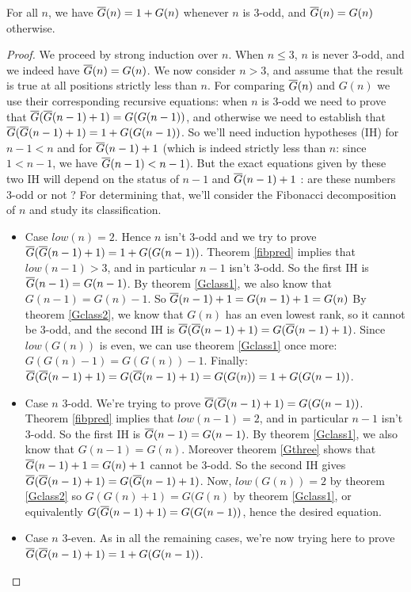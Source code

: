 \documentclass[a4paper,11pt]{article}
\begin{document}
\begin{theorem}\label{comp-fg-g}
For all $n$, we have $\overline{G}(n)=1+G(n)$ whenever $n$ is 3-odd,
and $\overline{G}(n)=G(n)$ otherwise.
\end{theorem}
\begin{proof}
We proceed by strong induction over $n$.
When $n\le 3$, $n$ is never \mbox{3-odd}, and we indeed have
$\overline{G}(n)=G(n)$. We now consider $n>3$, and assume that
the result is true at all positions strictly less than $n$.
For comparing $\overline{G}(n)$ and $G(n)$ we use their corresponding
recursive equations: when $n$ is 3-odd we need to prove that
$\overline{G}(\overline{G}(n-1)+1)=G(G(n-1))$, and otherwise we need to establish
that $\overline{G}(\overline{G}(n-1)+1)=1+G(G(n-1))$. So we'll need
induction hypotheses (IH) for $n-1<n$ and for $\overline{G}(n-1)+1$
(which is indeed strictly less than $n$:
since $1<n-1$, we have $\overline{G}(n-1)<n-1$). But the exact equations
given by these two IH will depend on the
status of $n-1$ and $\overline{G}(n-1)+1$ : are these numbers 3-odd or not ?
For determining that, we'll consider the Fibonacci decomposition
of $n$ and study its classification.
\begin{itemize}
\item Case $low(n)=2$. Hence $n$ isn't 3-odd and we try to prove
  $\overline{G}(\overline{G}(n-1)+1)=1+G(G(n-1))$. Theorem \ref{fibpred} implies that
  $low(n-1)>3$, and in particular $n-1$ isn't 3-odd.
  So the first IH is $\overline{G}(n-1)=G(n-1)$. By theorem
  \ref{Gclass1}, we also know that $G(n-1)=G(n)-1$.
  So $\overline{G}(n-1)+1=G(n-1)+1=G(n)$
  By theorem \ref{Gclass2}, we know that $G(n)$ has an even lowest
  rank, so it cannot be 3-odd, and the second IH is
  $\overline{G}(\overline{G}(n-1)+1)=G(\overline{G}(n-1)+1)$.
  Since $low(G(n))$ is even, we can use theorem \ref{Gclass1} once
  more: $G(G(n)-1) = G(G(n))-1$.
  Finally: $\overline{G}(\overline{G}(n-1)+1)=G(\overline{G}(n-1)+1)=G(G(n))=1+G(G(n-1))$.
\item Case $n$ 3-odd. We're trying to prove
  $\overline{G}(\overline{G}(n-1)+1)=G(G(n-1))$. Theorem \ref{fibpred} implies that
  $low(n-1) = 2$, and in particular $n-1$ isn't 3-odd.
  So the first IH is $\overline{G}(n-1)=G(n-1)$.
  By theorem \ref{Gclass1}, we also know that $G(n-1)=G(n)$.
  Moreover theorem \ref{Gthree} shows that $\overline{G}(n-1)+1 = G(n)+1$
  cannot be 3-odd.
  So the second IH gives $\overline{G}(\overline{G}(n-1)+1) = G(\overline{G}(n-1)+1)$.
  Now, $low(G(n))=2$ by theorem \ref{Gclass2} so $G(G(n)+1)=G(G(n)$
  by theorem \ref{Gclass1}, or equivalently $G(\overline{G}(n-1)+1)=G(G(n-1))$,
  hence the desired equation.
\item Case $n$ 3-even. As in all the remaining cases, we're now trying here
  to prove $\overline{G}(\overline{G}(n-1)+1)=1+G(G(n-1))$.

\end{itemize}
\end{proof}
\end{document}
